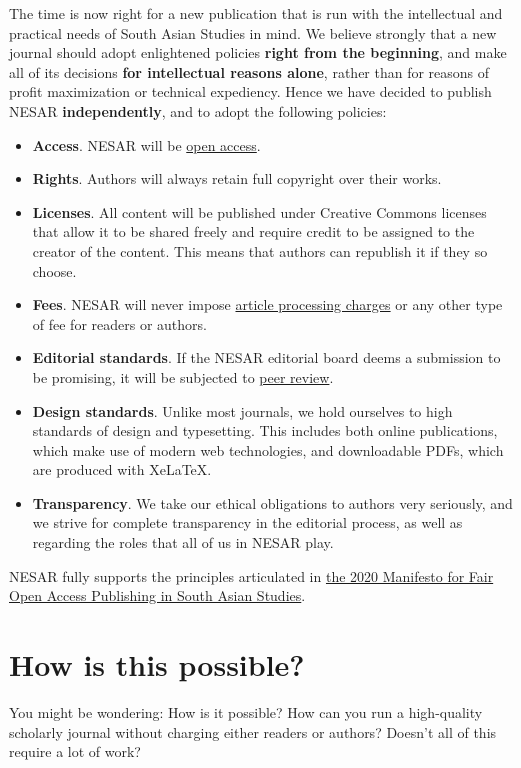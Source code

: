 The time is now right for a new publication that is run with the intellectual and practical needs of South Asian Studies in mind. We believe strongly that a new journal should adopt enlightened policies \textbf{right from the beginning}, and make all of its decisions \textbf{for intellectual reasons alone}, rather than for reasons of profit maximization or technical expediency. Hence we have decided to publish NESAR \textbf{independently}, and to adopt the following policies:

\begin{itemize}
      \item \textbf{Access}. NESAR will be \hyperref[h2ni9pkdxmw8]{open access}.
	\item \textbf{Rights}. Authors will always retain full copyright over their works.
	\item \textbf{Licenses}. All content will be published under Creative Commons licenses that allow it to be shared freely and require credit to be assigned to the creator of the content. This means that authors can republish it if they so choose.
	\item \textbf{Fees}. NESAR will never impose \hyperref[whjsbp15r2e9]{article processing charges} or any other type of fee for readers or authors.
	\item \textbf{Editorial standards}. If the NESAR editorial board deems a submission to be promising, it will be subjected to \hyperref[a4tnixdc6uio]{peer review}.
	\item \textbf{Design standards}. Unlike most journals, we hold ourselves to high standards of design and typesetting. This includes both online publications, which make use of modern web technologies, and downloadable PDFs, which are produced with XeLaTeX.
	\item \textbf{Transparency}. We take our ethical obligations to authors very seriously, and we strive for complete transparency in the editorial process, as well as regarding the roles that all of us in NESAR play.
\end{itemize}
      
NESAR fully supports the principles articulated in \href{https://foasas.org/}{the 2020 Manifesto for Fair Open Access Publishing in South Asian Studies}.

\section{How is this possible?}\label{idjrqnlzrk1}
      You might be wondering: How is it possible? How can you run a high-quality scholarly journal without charging either readers or authors? Doesn’t all of this require a lot of work?

